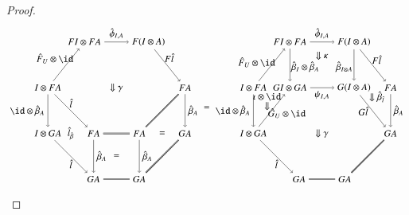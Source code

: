 \begin{proof}
\begin{equation}
\begin{aligned}
\begin{tikzpicture}[scale=1.7]
\node (llb) at (0,1) {$I \otimes GA$};
\node (llt) at (0,2) {$I \otimes FA$};
\node (bbl) at (1,0) {$GA$};
\node (bml)at (1,1) {$FA$};
\node (tl) at (0.8,3) {$FI \otimes FA$};
\node (bbr) at (2,0) {$GA$};
\node (bmr) at (2,1) {$FA$};
\node (tr) at (2.2,3) {$F(I \otimes A)$};
\node (brr) at (3,1) {$GA$};
\node (trr) at (3,2) {$FA$};
\draw[->] (llb) to node [below]{$\hat{l}$} (bbl);
\draw[->] (llt) to node [left]{$\id \otimes \hat{\beta}_A$} (llb);
\draw[->] (llt) to node [above,xshift=-12,yshift=-2]{${\hat{F}_U} \otimes \id$} (tl);
\draw[->] (llt) to node [above]{$\hat{l}$} (bml);
\draw[->] (tl) to node [above]{$\hat{\phi}_{I,A}$} (tr);
\draw[double] (bml) to (bmr);
\draw[double] (bbl) to (bbr);
\draw[double] (bbr) to (brr);
\draw[->] (tr) to node [above,xshift=2]{$F\hat{l}$} (trr);
\draw[double] (bmr) to (trr);
\draw[->] (trr) to node [right]{$\hat{\beta}_A$} (brr);
\draw[->] (bml) to node [right]{$\hat{\beta}_A$} (bbl);
\draw[->] (bmr) to node [right]{$\hat{\beta}_A$} (bbr);
\node at (1.5, 2) {$\Downarrow \gamma$};
\node at (0.5, 1) {$\hat{l}_{\hat{\beta}}$};
\node at (1.5, 0.5) {$=$};
\node at (2.5, 1) {$=$};
\end{tikzpicture}
\end{aligned}
=
\begin{aligned}
\begin{tikzpicture}[scale=1.7]
\node (llb) at (0,1) {$I \otimes GA$};
\node (llt) at (0,2) {$I \otimes FA$};
\node (bbl) at (1,0) {$GA$};
\node (bml) at (0.8,2) {$GI \otimes GA$};
\node (tl) at (0.8,3) {$FI \otimes FA$};
\node (bbr) at (2,0) {$GA$};
\node (bmr) at (2.2,2) {$G(I \otimes A)$};
\node (tr) at (2.2,3) {$F(I \otimes A)$};
\node (brr) at (3,1) {$GA$};
\node (trr) at (3,2) {$FA$};
\draw[->] (llb) to node [below]{$\hat{l}$} (bbl);
\draw[->] (llt) to node [left]{$\id \otimes \hat{\beta}_A$} (llb);
\draw[->] (llt) to node [above,xshift=-16pt,yshift=-6pt]{${\hat{F}_U} \otimes \id$} (tl);
\draw[->] (llb) to node [below, xshift=16,yshift=6]{$ \hat{G}_U \otimes \id$} (bml);
\draw[->] (tl) to node [above]{$\hat{\phi}_{I,A}$} (tr);
\draw[->] (bml) to node [below] {$\psi_{I,A}$} (bmr);
\draw[double] (bbl) to (bbr);
\draw[double] (bbr) to (brr);
\draw[->] (tr) to node [above,xshift=4, yshift=-2]{$F\hat{l}$} (trr);
\draw[->] (bmr) to node [below,xshift=-10,yshift=8] {$G \hat{l}$} (brr);
\draw[->] (trr) to node [right]{$\hat{\beta}_A$} (brr);
\draw[->] (tl) to node [right,xshift=-2,yshift=-2]{$\hat{\beta}_I \otimes \hat{\beta}_A$} (bml);
\draw[->] (tr) to node [left,xshift=2,yshift=-2]{$\hat{\beta}_{I \otimes A}$} (bmr);
\node at (1.5, 2.7) {$\Downarrow \kappa$};
\node at (0.3, 1.6) {$\Downarrow$};
\node at (0.3, 1.8) {$\iota \otimes \id$};
\node at (2.7,1.8) {$\Downarrow \hat{\beta}_{\hat{l}}$};
\node at (1.5, 1) {$\Downarrow \gamma$};
\end{tikzpicture}
\end{aligned}
\end{equation}


\end{proof}
